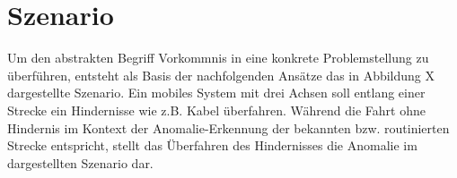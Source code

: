 \section{Szenario}
Um den abstrakten Begriff Vorkommnis in eine konkrete Problemstellung zu überführen, entsteht als Basis der nachfolgenden Ansätze das in Abbildung X dargestellte Szenario. \newline
Ein mobiles System mit drei Achsen soll entlang einer Strecke ein Hindernisse wie z.B. Kabel überfahren. Während die Fahrt ohne Hindernis im Kontext der Anomalie-Erkennung der bekannten bzw. routinierten Strecke entspricht, stellt das Überfahren des Hindernisses die Anomalie im dargestellten Szenario dar. 